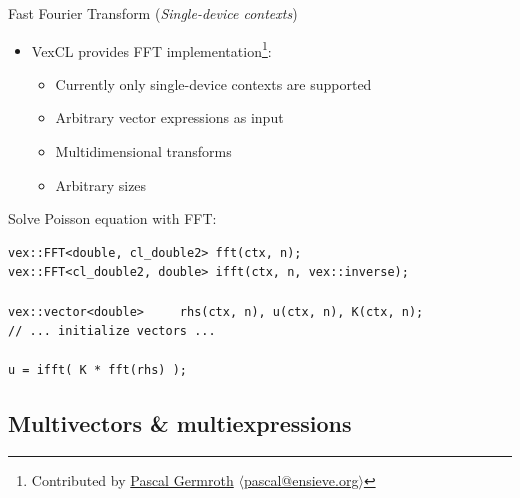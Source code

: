\documentclass[@BEAMER_OPTIONS@]{beamer}
\newcommand{\singledevice}{\hspace{1cm}\footnotesize(\emph{Single-device contexts})}
\begin{document}
\begin{frame}[fragile]{Fast Fourier Transform \singledevice}
    \begin{itemize}
        \item VexCL provides FFT implementation\footnote{Contributed by
            \href{https://github.com/neapel}{Pascal Germroth}
            $\langle$\href{mailto:pascal@ensieve.org}{pascal@ensieve.org}$\rangle$}:
            \begin{itemize}
                \item Currently only single-device contexts are supported
                \item Arbitrary vector expressions as input
                \item Multidimensional transforms
                \item Arbitrary sizes
            \end{itemize}
    \end{itemize}
    \begin{exampleblock}{Solve Poisson equation with FFT:}
        \begin{lstlisting}
vex::FFT<double, cl_double2> fft(ctx, n);
vex::FFT<cl_double2, double> ifft(ctx, n, vex::inverse);

vex::vector<double>     rhs(ctx, n), u(ctx, n), K(ctx, n);
// ... initialize vectors ...

u = ifft( K * fft(rhs) );
        \end{lstlisting}
    \end{exampleblock}
\end{frame}

\note{ }

\subsection{Multivectors \& multiexpressions}
\end{document}
